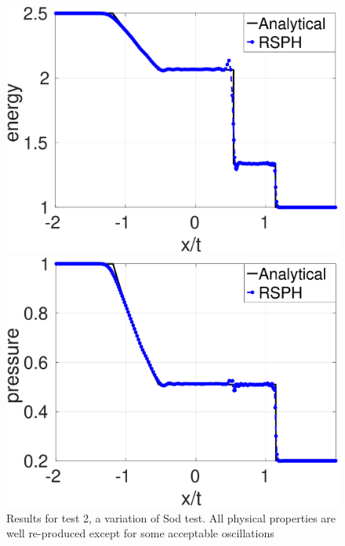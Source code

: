\begin{figure}[H]
\begin{minipage}{.495\textwidth}
        \includegraphics[width=0.99 \textwidth]{Chapter-4/Figures/GSPH-Sod/GRod-RCM-e}
    \end{minipage}%
    \begin{minipage}{.495 \textwidth}
        \centering
        \includegraphics[width=0.99 \textwidth]{Chapter-4/Figures/GSPH-Sod/GRod-RCM-p}
    \end{minipage}%
    \caption{Results for test 2, a variation of Sod test. All physical properties are well re-produced except for some acceptable oscillations}
    \label{fig:RCM-GSPH-Sod}
\end{figure}

